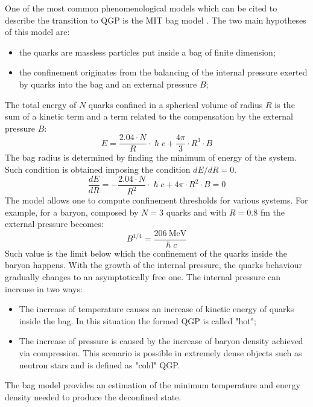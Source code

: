 One of the most common phenomenological models which can be cited to describe the transition to QGP is the MIT bag model \cite{PhysRevD.9.3471,PhysRevD.10.2599}.
The two main hypotheses of this model are:
\begin{itemize}
    \item the quarks are massless particles put inside a bag of finite dimension;
    \item the confinement originates from the balancing of the internal pressure exerted by quarks into the bag and an external pressure $B$;
\end{itemize}
The total energy of $N$ quarks confined in a spherical volume of radius $R$ is the sum of a kinetic term and a term related to the compensation by the external pressure $B$:
\begin{equation}
    E=\frac{2.04\cdot N}{R}\cdot \hslash c + \frac{4\pi}{3}\cdot R^3\cdot B
\end{equation}
The bag radius is determined by finding the minimum of energy of the system.
Such condition is obtained imposing the condition $dE/dR=0$.
\begin{equation}
\frac{dE}{dR}=-\frac{2.04\cdot N}{R^2}\cdot \hslash c + 4\pi\cdot R^2\cdot B = 0
\end{equation}
The model allows one to compute confinement thresholds for various systems.
For example, for a baryon, composed by $N=3$ quarks and with $R=0.8$ fm the external pressure becomes:
\begin{equation}
B^{1/4} = \frac{206\ \mathrm{MeV}}{\hslash c}
\end{equation}
Such value is the limit below which the confinement of the quarks inside the baryon happens.
With the growth of the internal pressure, the quarks behaviour gradually changes to an asymptotically free one.
The internal pressure can increase in two ways:
\begin{itemize}
\item The increase of temperature causes an increase of kinetic energy of quarks inside the bag. In this situation the formed QGP is called "hot";
\item The increase of pressure is caused by the increase of baryon density achieved via compression. This scenario is possible in extremely dense objects such as neutron stars and is defined as "cold" QGP.
\end{itemize}

The bag model provides an estimation of the minimum temperature and energy density needed to produce the deconfined state.

